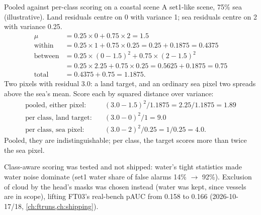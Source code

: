 \begin{worked}[label={we:finetune:totalvar}]{Pooled against per-class scoring on a coastal scene}
A set1-like scene, 75\% sea (illustrative\tbrk\tagA). Land residuals centre on 0 with variance 1; sea residuals centre on 2 with variance 0.25.
\begin{align*}
  \mu &= 0.25 \times 0 + 0.75 \times 2 = 1.5\\
  \text{within} &= 0.25 \times 1 + 0.75 \times 0.25 = 0.25 + 0.1875 = 0.4375\\
  \text{between} &= 0.25 \times (0 - 1.5)^2 + 0.75 \times (2 - 1.5)^2\\
                 &= 0.25 \times 2.25 + 0.75 \times 0.25 = 0.5625 + 0.1875 = 0.75\\
  \text{total} &= 0.4375 + 0.75 = 1.1875.
\end{align*}
Two pixels with residual 3.0: a land target, and an ordinary sea pixel two spreads above the sea's mean. Score each by squared distance over variance:
\begin{align*}
  \text{pooled, either pixel:}&\quad (3.0 - 1.5)^2 / 1.1875 = 2.25 / 1.1875 = 1.89\\
  \text{per class, land target:}&\quad (3.0 - 0)^2 / 1 = 9.0\\
  \text{per class, sea pixel:}&\quad (3.0 - 2)^2 / 0.25 = 1 / 0.25 = 4.0.
\end{align*}
Pooled, they are indistinguishable; per class, the target scores more than twice the sea pixel.
\end{worked}

\begin{drift}
Class-aware scoring was tested and not shipped: water's tight statistics made water noise dominate (set1 water share of false alarms 14\% $\to$ 92\%). Exclusion of
cloud by the head's masks was chosen instead (water was kept, since vessels are in scope), lifting FT03's real-bench pAUC from 0.158 to 0.166 (2026-10-17/18,
\cref{ch:ftruns,ch:shipping}).\tbrk{}
\end{drift}

